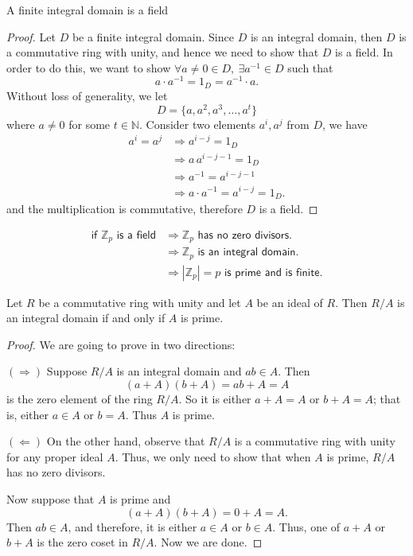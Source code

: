 \begin{theorem}
    A finite integral domain is a field
\end{theorem}
\begin{proof}
    Let $D$ be a finite integral domain. Since $D$ is an integral domain, then $D$ is a commutative 
    ring with unity, and hence we need to show that $D$ is a field. In order to do this, we 
    want to show $\forall a \neq 0 \in D, \> \exists a^{-1} \in D$ such that 
    \[
        a \cdot a^{-1} = 1_D = a^{-1} \cdot a.
    \]
    Without loss of generality, we let 
    \[
        D = \{ a, a^2, a^3, \ldots, a^t \} 
    \]
    where $a \neq 0$ for some $t \in \mathbb{N}$. Consider two elements $a^i, a^j$ from $D$, we have 
    \begin{align*}
        a^i = a^j &\Rightarrow a^{i-j} = 1_D\\
        &\Rightarrow a\, a^{i-j-1} = 1_D\\
        &\Rightarrow a^{-1} = a^{i-j-1}\\
        &\Rightarrow a \cdot a^{-1} = a^{i-j} = 1_D.
    \end{align*}
    and the multiplication is commutative, therefore $D$ is a field.
\end{proof}
\begin{remark}
    \begin{align*}
        \textsf{if } \mathbb{Z}_p \textsf{ is a field} &\Longrightarrow \mathbb{Z}_p \textsf{ has no zero divisors.}\\
        &\Longrightarrow \mathbb{Z}_p \textsf{ is an integral domain.}\\
        &\Longrightarrow |\mathbb{Z}_p| = p \textsf{ is prime and is finite.}
    \end{align*}
\end{remark}

\begin{theorem}
    Let $R$ be a commutative ring with unity and let $A$ be an ideal of $R$. Then 
    $R/A$ is an integral domain if and only if $A$ is prime.
\end{theorem}
\begin{proof}
    We are going to prove in two directions:

    $(\Rightarrow)$ Suppose $R/A$ is an integral domain and $ab \in A$. Then 
    \[
        (a + A)(b + A) = ab + A = A
    \]
    is the zero element of the ring $R/A$. So it is either $a + A = A$ 
    or $b + A = A$; that is, either $a \in A$ or $b = A$. Thus $A$ is prime. 
    
    $(\Leftarrow)$ On the other hand, observe that $R/A$ is a commutative ring with 
    unity for any proper ideal $A$. Thus, we only need to show that when $A$ 
    is prime, $R/A$ has no zero divisors.

    Now suppose that $A$ is prime and 
    \[
        (a + A) (b+A) = 0 + A = A.
    \]
    Then $ab \in A$, and therefore, it is either $a \in A$ or
    $b \in A$. Thus, one of 
    $a + A$ or $b + A$ is the zero coset in $R/A$. Now we are done. 
\end{proof}

